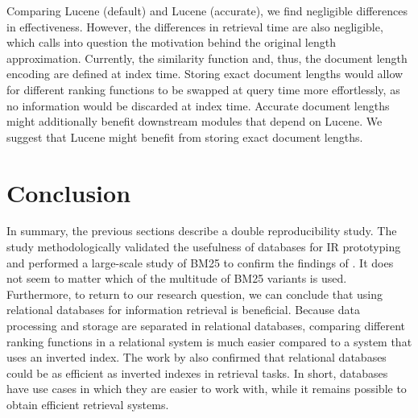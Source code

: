 Comparing Lucene (default) and Lucene (accurate), we find negligible differences in effectiveness. However, the differences in retrieval time are also negligible, which calls into question the motivation behind the original length approximation. Currently, the similarity function and, thus, the document length encoding are defined at index time. Storing exact document lengths would allow for different ranking functions to be swapped at query time more effortlessly, as no information would be discarded at index time. Accurate document lengths might additionally benefit downstream modules that depend on Lucene. We suggest that Lucene might benefit from storing exact document lengths.

\section{Conclusion}
In summary, the previous sections describe a double reproducibility study. The study methodologically validated the usefulness of databases for IR prototyping and performed a large-scale study of BM25 to confirm the findings of \citet{trotman-bm25}. It does not seem to matter which of the multitude of BM25 variants is used.
Furthermore, to return to our research question, we can conclude that using relational databases for information retrieval is beneficial. Because data processing and storage are separated in relational databases, comparing different ranking functions in a relational system is much easier compared to a system that uses an inverted index. The work by \citet{OldDog} also confirmed that relational databases could be as efficient as inverted indexes in retrieval tasks. In short, databases have use cases in which they are easier to work with, while it remains possible to obtain efficient retrieval systems.
